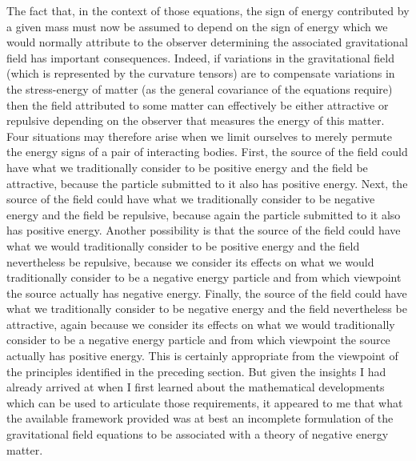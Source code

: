 \documentclass[notitlepage,12pt]{report}
\begin{document}
The fact that, in the context of those equations, the sign of energy contributed by a given mass must now be assumed to depend on the sign of energy which we would normally attribute to the observer determining the associated gravitational field has important consequences. Indeed, if variations in the gravitational field (which is represented by the curvature tensors) are to compensate variations in the stress-energy of matter (as the general covariance of the equations require) then the field attributed to some matter can effectively be either attractive or repulsive depending on the observer that measures the energy of this matter. Four situations may therefore arise when we limit ourselves to merely permute the energy signs of a pair of interacting bodies. First, the source of the field could have what we traditionally consider to be positive energy and the field be attractive, because the particle submitted to it also has positive energy. Next, the source of the field could have what we traditionally consider to be negative energy and the field be repulsive, because again the particle submitted to it also has positive energy. Another possibility is that the source of the field could have what we would traditionally consider to be positive energy and the field nevertheless be repulsive, because we consider its effects on what we would traditionally consider to be a negative energy particle and from which viewpoint the source actually has negative energy. Finally, the source of the field could have what we traditionally consider to be negative energy and the field nevertheless be attractive, again because we consider its effects on what we would traditionally consider to be a negative energy particle and from which viewpoint the source actually has positive energy. This is certainly appropriate from the viewpoint of the principles identified in the preceding section. But given the insights I had already arrived at when I first learned about the mathematical developments which can be used to articulate those requirements, it appeared to me that what the available framework provided was at best an incomplete formulation of the gravitational field equations to be associated with a theory of negative energy matter.
\end{document}
